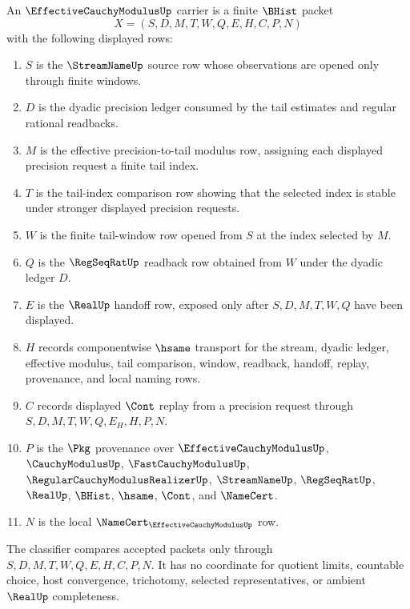 \begin{definition}
\label{def:effective-cauchy-modulus-carrier}
An $\EffectiveCauchyModulusUp$ carrier is a finite $\BHist$ packet
$$
X=(S,D,M,T,W,Q,E,H,C,P,N)
$$
with the following displayed rows:
\begin{enumerate}
\item $S$ is the $\StreamNameUp$ source row whose observations are opened only through finite windows.
\item $D$ is the dyadic precision ledger consumed by the tail estimates and regular rational readbacks.
\item $M$ is the effective precision-to-tail modulus row, assigning each displayed precision request a finite tail index.
\item $T$ is the tail-index comparison row showing that the selected index is stable under stronger displayed precision requests.
\item $W$ is the finite tail-window row opened from $S$ at the index selected by $M$.
\item $Q$ is the $\RegSeqRatUp$ readback row obtained from $W$ under the dyadic ledger $D$.
\item $E$ is the $\RealUp$ handoff row, exposed only after $S,D,M,T,W,Q$ have been displayed.
\item $H$ records componentwise $\hsame$ transport for the stream, dyadic ledger, effective modulus, tail comparison, window, readback, handoff, replay, provenance, and local naming rows.
\item $C$ records displayed $\Cont$ replay from a precision request through $S,D,M,T,W,Q,E_H,H,P,N$.
\item $P$ is the $\Pkg$ provenance over $\EffectiveCauchyModulusUp$, $\CauchyModulusUp$, $\FastCauchyModulusUp$, $\RegularCauchyModulusRealizerUp$, $\StreamNameUp$, $\RegSeqRatUp$, $\RealUp$, $\BHist$, $\hsame$, $\Cont$, and $\NameCert$.
\item $N$ is the local $\NameCert_{\EffectiveCauchyModulusUp}$ row.
\end{enumerate}
The classifier compares accepted packets only through $S,D,M,T,W,Q,E,H,C,P,N$. It has no coordinate for quotient limits, countable choice, host convergence, trichotomy, selected representatives, or ambient $\RealUp$ completeness.
\end{definition}

